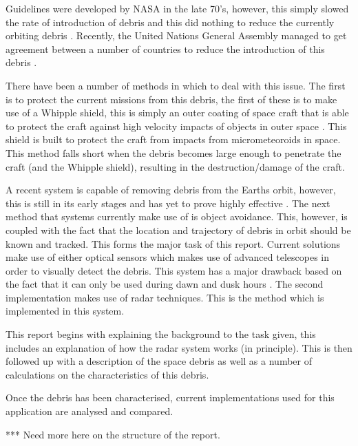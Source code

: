 \documentclass[11pt]{witseiepaper}
\begin{document}
Guidelines were developed by NASA in the late 70's, however, this simply slowed the rate of introduction of debris and this did nothing to reduce the currently orbiting debris \cite{spaceDebrisGuide}. Recently, the United Nations General Assembly managed to get agreement between a number of countries to reduce the introduction of this debris \cite{debrisGuidelinesAgreement}.

There have been a number of methods in which to deal with this issue. The first is to protect the current missions from this debris, the first of these is to make use of a Whipple shield, this is simply an outer coating of space craft that is able to protect the craft against high velocity impacts of objects in outer space \cite{Whipple}. This shield is built to protect the craft from impacts from micrometeoroids in space.
This method falls short when the debris becomes large enough to penetrate the craft (and the Whipple shield), resulting in the destruction/damage of the craft.

A recent system is capable of removing debris from the Earths orbit, however, this is still in its early stages and has yet to prove highly effective \cite{removalSpaceDebris}.
The next method that systems currently make use of is object avoidance. This, however, is coupled with the fact that the location and trajectory of debris in orbit should be known and tracked. This forms the major task of this report.
Current solutions make use of either optical sensors which makes use of advanced telescopes in order to visually detect the debris. This system has a major drawback based on the fact that it can only be used during dawn and dusk hours \cite{OrbitalDebrisTechnicalAssessment,telescope,ZenithRanging}.
The second implementation makes use of radar techniques. This is the method which is implemented in this system.

This report begins with explaining the background to the task given, this includes an explanation of how the radar system works (in principle).
This is then followed up with a description of the space debris as well as a number of calculations on the characteristics of this debris.

Once the debris has been characterised, current implementations used for this application are analysed and compared.  

*** Need more here on the structure of the report.
\end{document}
